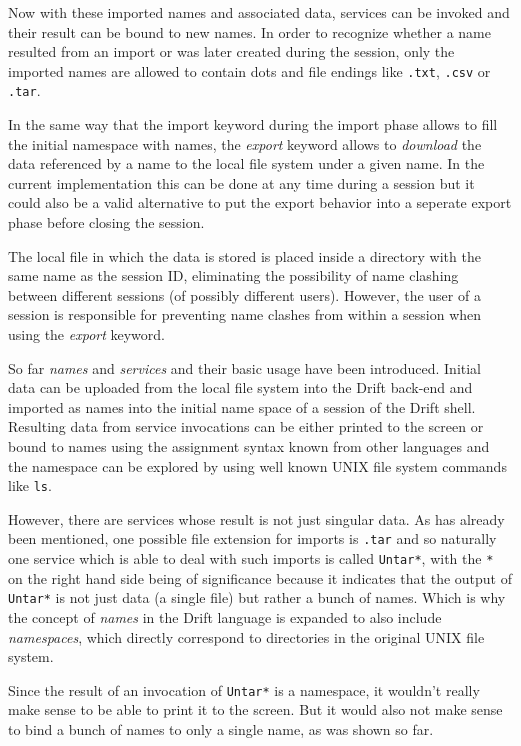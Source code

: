 Now with these imported names and associated data, services can
be invoked and their result can be bound to new names. In order
to recognize whether a name resulted from an import or was later
created during the session, only the imported names are allowed
to contain dots and file endings like \texttt{.txt}, \texttt{.csv}
or \texttt{.tar}.

In the same way that the import keyword during the import phase
allows to fill the initial namespace with names, the \textit{export}
keyword allows to \textit{download} the data referenced by a name
to the local file system under a given name. In the current
implementation this can be done at any time during a session
but it could also be a valid alternative to put the export
behavior into a seperate export phase before closing the session.

The local file in which the data is stored is placed inside a
directory with the same name as the session ID, eliminating the
possibility of name clashing between different sessions (of
possibly different users). However, the user of a session is
responsible for preventing name clashes from within a session
when using the \textit{export} keyword.
\newline

So far \textit{names} and \textit{services} and their basic
usage have been introduced. Initial data can be uploaded from
the local file system into the Drift back-end and imported as
names into the initial name space of a session of the Drift shell.
Resulting data from service invocations can be either printed
to the screen or bound to names using the assignment syntax known
from other languages and the namespace can be explored by using
well known UNIX file system commands like \texttt{ls}.

However, there are services whose result is not just singular data.
As has already been mentioned, one possible file extension for
imports is \texttt{.tar} and so naturally one service which is
able to deal with such imports is called \texttt{Untar*},
with the \texttt{*} on the right hand side being of significance
because it indicates that the output of \texttt{Untar*} is not
just data (a single file) but rather a bunch of names.
Which is why the concept of \textit{names} in the Drift language
is expanded to also include \textit{namespaces}, which directly
correspond to directories in the original UNIX file system.

Since the result of an invocation of \texttt{Untar*} is a
namespace, it wouldn't really make sense to be able to print
it to the screen. But it would also not make sense to bind
a bunch of names to only a single name, as was shown so far.

